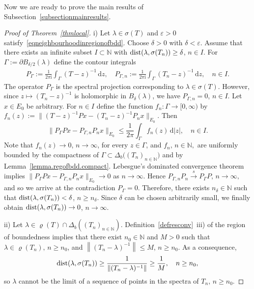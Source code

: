 \documentclass[a4paper,reqno]{amsart}
\begin{document}
{Now we are ready to prove the main results of Subsection~\ref{subsectionmainresults}.

\begin{proof}[Proof of Theorem~{\rm\ref{thmlocal}}]
i) 
Let $\lambda\in\sigma(T)$ and $\varepsilon>0$ satisfy~\eqref{eqneighbourhoodinregionofbdd}.
Choose $\delta>0$ with $\delta<\varepsilon$. Assume that there exists an infinite subset $I\subset{\mathbb{N}}$ with ${\rm dist}(\lambda,\sigma(T_n))\geq\delta$, $n\in I$. 
For $\Gamma:=\partial B_{{\delta}/2}(\lambda)$ define the contour integrals
\begin{align*}
 P_{\Gamma}:=\frac{1}{2\pi{\mathrm{i}}}\int_{\Gamma} (T-z)^{-1}\,{\mathrm{d}} z, \quad  P_{\Gamma,n}:=\frac{1}{2\pi{\mathrm{i}}}\int_{\Gamma} (T_n-z)^{-1}\,{\mathrm{d}} z, \quad n\in I.
\end{align*}
The operator $P_{\Gamma}$ is the spectral projection corresponding to $\lambda\in\sigma(T)$. However, since $z\mapsto (T_n-z)^{-1}$ is holomorphic in $B_{\delta}(\lambda)$, we have $P_{\Gamma,n}=0$, $n\in I$.
Let $x\in E_0$ be arbitrary. For $n\in I$ define the function $f_n:\Gamma\to [0,\infty)$ by $f_n(z):=\|(T-z)^{-1}Px-(T_n-z)^{-1}P_nx\|_{E_0}$.
Then $$\|P_{\Gamma}Px-P_{\Gamma,n}P_nx\|_{E_0}\leq \frac{1}{2\pi}\int_{\Gamma} f_n (z)\,{\mathrm{d}} |z|, \quad n\in I.$$
Note that $f_n(z)\to 0$, $n\to\infty$, for every $z\in\Gamma$, and $f_n,\,n\in{\mathbb{N}},$ are uniformly bounded by the compactness of $\Gamma\subset\Delta_b\big((T_n)_{n\in{\mathbb{N}}}\big)$ and by Lemma~\ref{lemma.regofbdd.compact}.
Lebesgue's dominated convergence theorem implies $\|P_{\Gamma}Px-P_{\Gamma,n}P_nx\|_{E_0}\to 0$ as $n\to\infty$.
Hence $P_{\Gamma,n}P_n {\stackrel{s}{\rightarrow}} P_{\Gamma}P, \,n\to\infty,$ and so we arrive at the contradiction $P_{\Gamma}=0$. 
Therefore, there exists $n_{\delta}\in{\mathbb{N}}$ such that ${\rm dist}(\lambda,\sigma(T_n))<\delta$, $n\geq n_{\delta}$.
Since $\delta$ can be chosen arbitrarily small, we finally obtain ${\rm dist}(\lambda,\sigma(T_n))\to 0$, $n\to\infty$.

ii)
Let $\lambda\in\varrho(T)\cap\Delta_b\left((T_n)_{n\in{\mathbb{N}}}\right)$. 
Definition~\ref{defresconv}~iii) of the region of boundedness implies that there exist $n_0\in{\mathbb{N}}$ and $M>0$ such that $\lambda\in\varrho(T_n),\,n\geq n_0$, 
and $\left\|(T_n-\lambda)^{-1}\right\|\leq M$, $n\geq n_0$.
As a consequence, $${{\rm dist}}(\lambda,\sigma(T_n))\geq \frac{1}{\left\|(T_n-\lambda)^{-1}\right\|}\geq \frac{1}{M}, \quad n\geq n_0,$$
so $\lambda$ cannot be the limit of a sequence of points in the spectra of $T_n,\,n\geq n_0$.
\end{proof}

}
\end{document}

